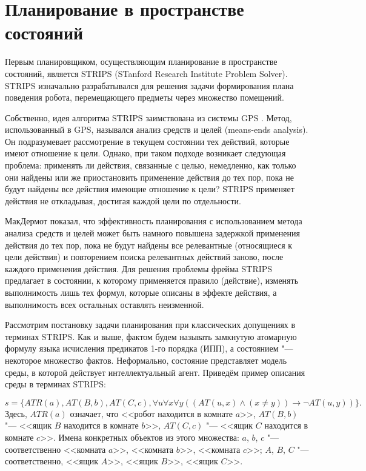 \documentclass[b5paper,11pt]{book}
\numberwithin{Def}{section}
\numberwithin{Th}{chapter}
\numberwithin{St}{chapter}
\begin{document}
	 
	
	\chapter*{Планирование в пространстве состояний}
	
	Первым планировщиком, осуществляющим планирование в пространстве состояний, является STRIPS (STanford Research Institute Problem Solver). STRIPS изначально разрабатывался для решения задачи формирования плана поведения робота, перемещающего предметы через множество помещений.
	
	Собственно, идея алгоритма STRIPS заимствована из системы GPS \cite{Fikes1971}. Метод, использованный в GPS, назывался анализ средств и целей (means-ends analysis). Он подразумевает рассмотрение в текущем состоянии тех действий, которые имеют отношение к цели. Однако, при таком подходе возникает следующая проблема: применять ли действия, связанные с целью, немедленно, как только они найдены или же приостановить применение действия до тех пор, пока не будут найдены все действия имеющие отношение к цели? STRIPS применяет действия не откладывая, достигая каждой цели по отдельности.
	
	МакДермот показал, что эффективность планирования с использованием метода анализа средств и целей может быть намного повышена задержкой применения действия до тех пор, пока не будут найдены все релевантные (относящиеся к цели действия) и повторением поиска релевантных действий заново, после каждого применения действия.	Для решения проблемы фрейма STRIPS предлагает в состоянии, к которому применяется правило (действие), изменять выполнимость лишь тех формул, которые описаны в эффекте действия, а выполнимость всех остальных оставлять неизменной.
	
	Рассмотрим постановку задачи планирования при классических допущениях в терминах STRIPS.	Как и выше, фактом будем называть замкнутую атомарную формулу языка исчисления предикатов 1-го порядка (ИПП), а состоянием "--- некоторое множество фактов. Неформально, состояние представляет модель среды, в которой действует  интеллектуальный агент.
	Приведём пример описания среды в терминах STRIPS:
	
	\[
		s = \{ATR(a), AT(B,b), AT(C,c), \forall u\forall x\forall y ((AT(u,x) \wedge (x \not= y)) \rightarrow \neg AT(u,y))\}.
	\]
	Здесь, $ATR(a)$ означает, что <<робот находится в комнате $a$>>, $AT(B,b)$ "--- <<ящик $B$ находится в комнате $b$>>, $AT(C,c)$ "--- <<ящик $C$ находится в комнате $c$>>. Имена конкретных объектов из этого множества: $a$, $b$, $c$ "--- соответственно <<комната $a$>>, <<комната $b$>>, <<комната $c$>>; $A$, $B$, $C$ "--- соответственно, <<ящик $A$>>, <<ящик $B$>>, <<ящик $C$>>.
	
\end{document}

